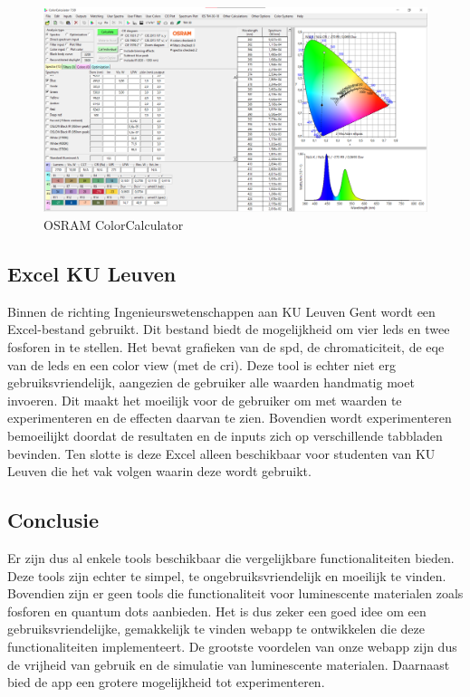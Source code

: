 \begin{figure}[H]
    \centering
    \includegraphics[width=0.95\linewidth]{figs/OSRAM_colorcalculator.png}
    \caption{OSRAM ColorCalculator ~\cite{selverianColorCalculatorSoftware2017}}%
    \label{fig:OSRAM ColorCalculator}
\end{figure}

\subsection{Excel KU Leuven}

Binnen de richting Ingenieurswetenschappen aan KU Leuven Gent wordt een Excel-bestand gebruikt. Dit bestand biedt de mogelijkheid om vier \gls{led}s en twee fosforen in te stellen. Het bevat grafieken van de \gls{spd}, de chromaticiteit, de \gls{eqe} van de \gls{led}s en een color view (met de \gls{cri}). Deze tool is echter niet erg gebruiksvriendelijk, aangezien de gebruiker alle waarden handmatig moet invoeren. Dit maakt het moeilijk voor de gebruiker om met waarden te experimenteren en de effecten daarvan te zien. Bovendien wordt experimenteren bemoeilijkt doordat de resultaten en de inputs zich op verschillende tabbladen bevinden. Ten slotte is deze Excel alleen beschikbaar voor studenten van KU Leuven die het vak volgen waarin deze wordt gebruikt.

\subsection{Conclusie}

Er zijn dus al enkele tools beschikbaar die vergelijkbare functionaliteiten bieden. Deze tools zijn echter te simpel, te ongebruiksvriendelijk en moeilijk te vinden. Bovendien zijn er geen tools die functionaliteit voor luminescente materialen zoals fosforen en quantum dots aanbieden. Het is dus zeker een goed idee om een gebruiksvriendelijke, gemakkelijk te vinden webapp te ontwikkelen die deze functionaliteiten implementeert. De grootste voordelen van onze webapp zijn dus de vrijheid van gebruik en de simulatie van luminescente materialen. Daarnaast bied de app een grotere mogelijkheid tot experimenteren.






